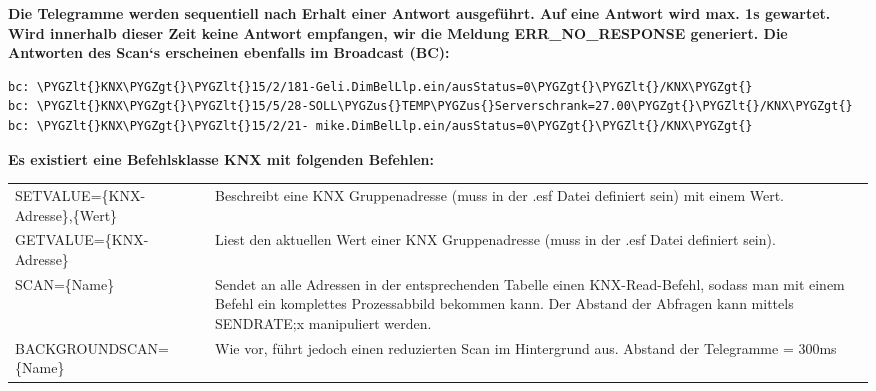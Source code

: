 \documentclass[letterpaper,10pt,english]{sphinxmanual}
\def\PYGZus{\char`\_}
\def\PYGZlt{\char`\<}
\def\PYGZgt{\char`\>}
\begin{document}
\textbf{Die Telegramme werden sequentiell nach Erhalt einer Antwort ausgeführt. Auf eine Antwort wird max. 1s gewartet. Wird innerhalb dieser Zeit keine Antwort empfangen, wir die Meldung ERR\_NO\_RESPONSE generiert. Die Antworten des Scan‘s erscheinen ebenfalls im Broadcast (BC):}

\begin{Verbatim}[commandchars=\\\{\}]
bc: \PYGZlt{}KNX\PYGZgt{}\PYGZlt{}15/2/181-Geli.DimBelLlp.ein/ausStatus=0\PYGZgt{}\PYGZlt{}/KNX\PYGZgt{}
bc: \PYGZlt{}KNX\PYGZgt{}\PYGZlt{}15/5/28-SOLL\PYGZus{}TEMP\PYGZus{}Serverschrank=27.00\PYGZgt{}\PYGZlt{}/KNX\PYGZgt{}
bc: \PYGZlt{}KNX\PYGZgt{}\PYGZlt{}15/2/21- mike.DimBelLlp.ein/ausStatus=0\PYGZgt{}\PYGZlt{}/KNX\PYGZgt{}
\end{Verbatim}

\begin{DUlineblock}{0em}
\item[] 
\end{DUlineblock}

\textbf{Es existiert eine Befehlsklasse KNX mit folgenden Befehlen:}

\begin{tabulary}{\linewidth}{|L|L|}
\hline

SETVALUE=\{KNX-Adresse\},\{Wert\}
 & 
Beschreibt eine KNX Gruppenadresse (muss in der .esf Datei definiert sein) mit einem Wert.
\\

GETVALUE=\{KNX-Adresse\}
 & 
Liest den aktuellen Wert einer KNX Gruppenadresse (muss in der .esf Datei definiert sein).
\\

SCAN=\{Name\}
 & 
Sendet an alle Adressen in der entsprechenden Tabelle einen KNX-Read-Befehl, sodass man mit einem Befehl ein komplettes Prozessabbild bekommen kann. Der Abstand der Abfragen kann mittels SENDRATE;x manipuliert werden.
\\

BACKGROUNDSCAN=\{Name\}
 & 
Wie vor, führt jedoch einen reduzierten Scan im Hintergrund aus. Abstand der Telegramme = 300ms
\\
\hline\end{tabulary}
\end{document}
